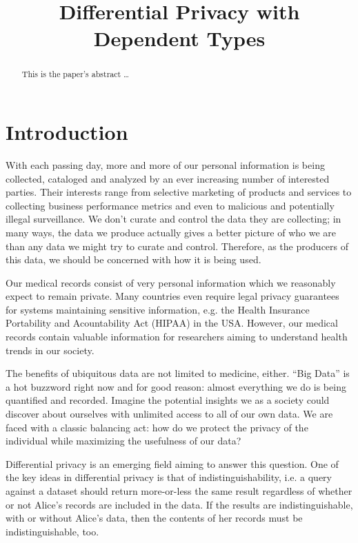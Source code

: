 \documentclass[12pt]{article}
\title{Differential Privacy with Dependent Types}
\begin{document}
\maketitle


\begin{abstract}
This is the paper's abstract \ldots
\end{abstract}


\section{Introduction}\label{sec:introduction}

With each passing day, more and more of our personal information is being collected, cataloged and analyzed by an ever increasing number of interested parties.
Their interests range from selective marketing of products and services to collecting business performance metrics and even to malicious and potentially illegal surveillance.
We don't curate and control the data they are collecting;
in many ways, the data we produce actually gives a better picture of who we are than any data we might try to curate and control.
Therefore, as the producers of this data, we should be concerned with how it is being used.

Our medical records consist of very personal information which we reasonably expect to remain private.
Many countries even require legal privacy guarantees for systems maintaining sensitive information, e.g. the Health Insurance Portability and Acountability Act (HIPAA) in the USA.
However, our medical records contain valuable information for researchers aiming to understand health trends in our society.

The benefits of ubiquitous data are not limited to medicine, either.
``Big Data'' is a hot buzzword right now and for good reason: almost everything we do is being quantified and recorded.
Imagine the potential insights we as a society could discover about ourselves with unlimited access to all of our own data.
We are faced with a classic balancing act: how do we protect the privacy of the individual while maximizing the usefulness of our data?

Differential privacy\cite{journals/cacm/Dwork11} is an emerging field aiming to answer this question.
One of the key ideas in differential privacy is that of indistinguishability, i.e. a query against a dataset should return more-or-less the same result regardless of whether or not Alice's records are included in the data.
If the results are indistinguishable, with or without Alice's data, then the contents of her records must be indistinguishable, too.
\end{document}
